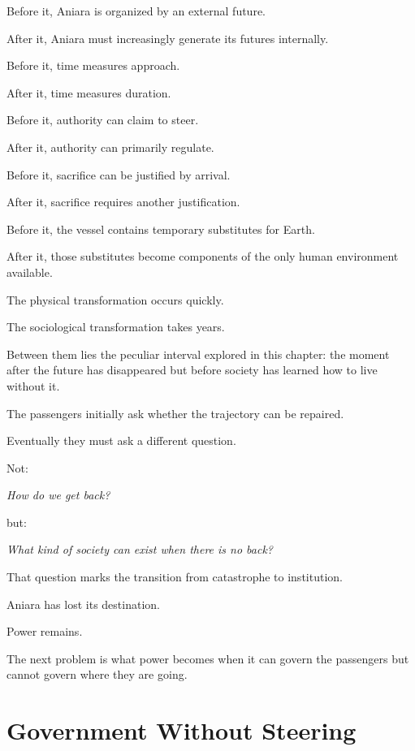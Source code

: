 \documentclass[11pt,oneside]{book}
\theoremstyle{definition}
\theoremstyle{remark}
\begin{document}
Before it, Aniara is organized by an external future.

After it, Aniara must increasingly generate its futures internally.

Before it, time measures approach.

After it, time measures duration.

Before it, authority can claim to steer.

After it, authority can primarily regulate.

Before it, sacrifice can be justified by arrival.

After it, sacrifice requires another justification.

Before it, the vessel contains temporary substitutes for Earth.

After it, those substitutes become components of the only human environment available.

The physical transformation occurs quickly.

The sociological transformation takes years.

Between them lies the peculiar interval explored in this chapter: the moment after the future has disappeared but before society has learned how to live without it.

The passengers initially ask whether the trajectory can be repaired.

Eventually they must ask a different question.

Not:

\begin{center}
\emph{How do we get back?}
\end{center}

but:

\begin{center}
\emph{What kind of society can exist when there is no back?}
\end{center}

That question marks the transition from catastrophe to institution.

Aniara has lost its destination.

Power remains.

The next problem is what power becomes when it can govern the passengers but cannot govern where they are going.

\chapter{Government Without Steering}
\end{document}
